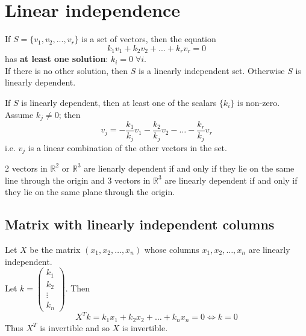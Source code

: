 \documentclass[a4paper, 12pt]{article}
\newenvironment{definition}[1][Definition]{\begin{trivlist}
\item[\hskip \labelsep {\bfseries #1}]}{\end{trivlist}}
\newenvironment{remark}[1][Remark]{\begin{trivlist}
\item[\hskip \labelsep {\bfseries #1}]}{\end{trivlist}}
\newcommand{\keyword}[1]{\textbf{#1}}
\begin{document}
    \section*{Linear independence}
    \begin{definition}
        If $S = \{v_1, v_2, ..., v_r\}$ is a set of vectors, then the equation
        \[k_1v_1 + k_2v_2 + ... + k_rv_r = 0\]
        has \keyword{at least one solution}: $k_i = 0 \; \forall i$.\\
        If there is no other solution, then $S$ is a linearly independent
        set. Otherwise $S$ is linearly dependent.
    \end{definition}
    \begin{remark}
        If $S$ is linearly dependent, then at least one of the scalars $\{k_i\}$ is
        non-zero. Assume $k_j \neq 0$; then
        \[v_j = -\frac{k_1}{k_j}v_1 - \frac{k_2}{k_j}v_2 - \dots - \frac{k_r}{k_j}v_r\]
        i.e. $v_j$ is a linear combination of the other vectors in the set.
    \end{remark}
    \begin{remark}
        2 vectors in $\mathbb{R}^2$ or $\mathbb{R}^3$ are lienarly dependent if and only if they
        lie on the same line through the origin and 3 vectors in $\mathbb{R}^3$ are
        linearly dependent if and only if they lie on the same plane
        through the origin.
    \end{remark}
    \subsection*{Matrix with linearly independent columns}
    Let $X$ be the matrix $(x_1, x_2, \dots, x_n)$ whose columns $x_1, x_2, \dots, x_n$
    are linearly independent.\\
    Let $k = \begin{pmatrix}
                k_1\\
                k_2\\
                \vdots\\
                k_n
        \end{pmatrix}$. Then
    \[X^Tk = k_1x_1 + k_2x_2 + \dots + k_nx_n = 0 \iff k = 0\]
    Thus $X^T$ is invertible and so $X$ is invertible.
\end{document}
